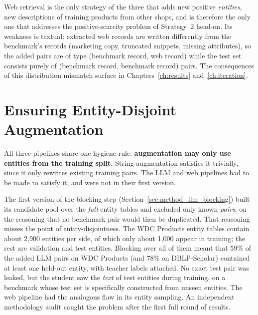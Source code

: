 \documentclass[a4paper,oneside,bibliography=totoc]{scrbook}
\begin{document}
Web retrieval is the only strategy of the three that adds new positive \emph{entities}, new descriptions of training products from other shops, and is therefore the only one that addresses the positive-scarcity problem of Strategy~2 head-on. Its weakness is textual: extracted web records are written differently from the benchmark's records (marketing copy, truncated snippets, missing attributes), so the added pairs are of type (benchmark record, web record) while the test set consists purely of (benchmark record, benchmark record) pairs. The consequences of this distribution mismatch surface in Chapters~\ref{ch:results} and~\ref{ch:iteration}.

\section{Ensuring Entity-Disjoint Augmentation}
\label{sec:method_disjoint}

All three pipelines share one hygiene rule: \textbf{augmentation may only use entities from the training split.} String augmentation satisfies it trivially, since it only rewrites existing training pairs. The LLM and web pipelines had to be made to satisfy it, and were not in their first version.

The first version of the blocking step (Section~\ref{sec:method_llm_blocking}) built its candidate pool over the \emph{full} entity tables and excluded only known \emph{pairs}, on the reasoning that no benchmark pair would then be duplicated. That reasoning misses the point of entity-disjointness. The WDC Products entity tables contain about 2{,}900 entities per side, of which only about 1{,}000 appear in training; the rest are validation and test entities. Blocking over all of them meant that 59\% of the added LLM pairs on WDC Products (and 78\% on DBLP-Scholar) contained at least one held-out entity, with teacher labels attached. No exact test pair was leaked, but the student saw the \emph{text} of test entities during training, on a benchmark whose test set is specifically constructed from unseen entities. The web pipeline had the analogous flaw in its entity sampling. An independent methodology audit caught the problem after the first full round of results.
\end{document}
